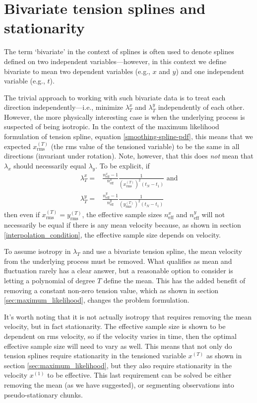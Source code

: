 \documentclass[10pt,journal]{IEEEtran}
\begin{document}
\section{Bivariate tension splines and stationarity}
\label{sec:bivariate}

The term `bivariate' in the context of splines is often used to denote splines defined on two independent variables---however, in this context we define bivariate to mean two dependent variables (e.g., $x$ and $y$) and one independent variable (e.g., $t$).

The trivial approach to working with such bivariate data is to treat each direction independently---i.e., minimize $\lambda^x_T$ and $\lambda^y_T$ independently of each other. However, the more physically interesting case is when the underlying process is suspected of being isotropic. In the context of the maximum likelihood formulation of tension spline, equation \ref{smoothing-spline-pdf}, this means that we expected $x^{(T)}_{\textrm{rms}}$ (the rms value of the tensioned variable) to be the same in all directions (invariant under rotation). Note, however, that this does \emph{not} mean that $\lambda_x$ should necessarily equal $\lambda_y$. To be explicit, if 
\begin{align}
\label{lambda_x}
\lambda^x_T =& \frac{n^x_{\textrm{eff}}-1}{n^x_{\textrm{eff}}} \frac{1}{ \left(x^{(T)}_{\textrm{rms}}\right)^2 (t_N-t_1)} \textrm{ and}\\
\lambda^y_T =& \frac{n^y_{\textrm{eff}}-1}{n^y_{\textrm{eff}}} \frac{1}{ \left(y^{(T)}_{\textrm{rms}}\right)^2 (t_N-t_1)}
\end{align}
then even if $x^{(T)}_{\textrm{rms}} = y^{(T)}_{\textrm{rms}}$, the effective sample sizes $n^x_{\textrm{eff}}$ and $n^y_{\textrm{eff}}$ will not necessarily be equal if there is any mean velocity because, as shown in section \ref{interpolation_condition}, the effective sample size depends on velocity.

To assume isotropy in $\lambda_T$ and use a bivariate tension spline, the mean velocity from the underlying process must be removed. What qualifies as mean and fluctuation rarely has a clear answer, but a reasonable option to consider is letting a polynomial of degree $T$ define the mean. This has the added benefit of removing a constant non-zero tension value, which as shown in section \ref{sec:maximum_likelihood}, changes the problem formulation. 

It's worth noting that it is not actually isotropy that requires removing the mean velocity, but in fact stationarity. The effective sample size is shown to be dependent on rms velocity, so if the velocity varies in time, then the optimal effective sample size will need to vary as well. This means that not only do tension splines require stationarity in the tensioned variable $x^{(T)}$ as shown in section \ref{sec:maximum_likelihood}, but they also require stationarity in the velocity $x^{(1)}$ to be effective. This last requirement can be solved be either removing the mean (as we have suggested), or segmenting observations into pseudo-stationary chunks.
\end{document}
